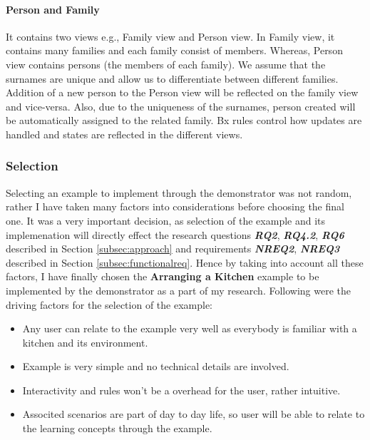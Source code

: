 \paragraph{Person and Family}
It contains two views e.g., Family view and Person view. In Family view, it contains many families and each family consist of members. Whereas, Person view contains persons (the members of each family). We assume that the surnames are unique and allow us to differentiate between different families. Addition of a new person to the Person view will be reflected on the family view and vice-versa. Also, due to the uniqueness of the surnames, person created will be automatically assigned to the related family. Bx rules control how updates are handled and states are reflected in the different views.

\subsubsection{Selection}\label{subsubsec:exampleselection}
Selecting an example to implement through the demonstrator was not random, rather I have taken many factors into considerations before choosing the final one. It was a very important decision, as selection of the example and its implemenation will directly effect the research questions \textbf{\textit{RQ2}}, \textbf{\textit{RQ4.2}}, \textbf{\textit{RQ6}} described in Section \ref{subsec:approach} and requirements \textbf{\textit{NREQ2}}, \textbf{\textit{NREQ3}} described in Section \ref{subsec:functionalreq}.
\newline\newline Hence by taking into account all these factors, I have finally chosen the \textbf{Arranging a Kitchen} example to be implemented by the demonstrator as a part of my research. Following were the driving factors for the selection of the example:
\begin{itemize}
	\item {Any user can relate to the example very well as everybody is familiar with a kitchen and its environment.}
	\item {Example is very simple and no technical details are involved.}
	\item {Interactivity and rules won't be a overhead for the user, rather intuitive.}
	\item {Associted scenarios are part of day to day life, so user will be able to relate to the learning concepts through the example.}
\end{itemize}

